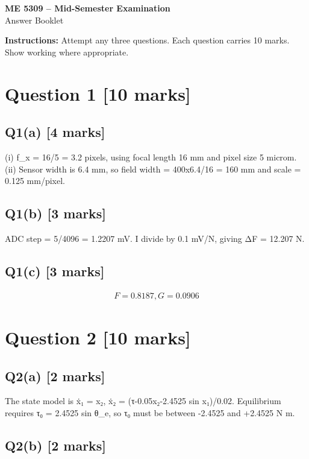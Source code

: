 \documentclass[11pt,a4paper]{article}
\begin{document}
\begin{center}
{\Large\bfseries ME 5309 -- Mid-Semester Examination}\\[3pt]
{\large Answer Booklet}\\[8pt]
\end{center}
\textbf{Instructions:} Attempt any three questions. Each question carries 10 marks. Show working where appropriate.
\section*{Question 1 \hfill [10 marks]}
\subsection*{Q1(a) \hfill [4 marks]}

(i) f\_x = 16/5 = 3.2 pixels, using focal length 16 mm and pixel size 5 microm.
(ii) Sensor width is 6.4 mm, so field width = 400x6.4/16 = 160 mm and scale = 0.125 mm/pixel.

\subsection*{Q1(b) \hfill [3 marks]}

ADC step = 5/4096 = 1.2207 mV.
I divide by 0.1 mV/N, giving ΔF = 12.207 N.

\subsection*{Q1(c) \hfill [3 marks]}

\[\begin{aligned}F = 0.8187, G = 0.0906\end{aligned}\]

\section*{Question 2 \hfill [10 marks]}
\subsection*{Q2(a) \hfill [2 marks]}

The state model is ẋ₁ = x₂, ẋ₂ = (τ-0.05x₂-2.4525 sin x₁)/0.02.
Equilibrium requires τ₀ = 2.4525 sin θ\_e, so τ₀ must be between -2.4525 and +2.4525 N m.

\subsection*{Q2(b) \hfill [2 marks]}
\end{document}
